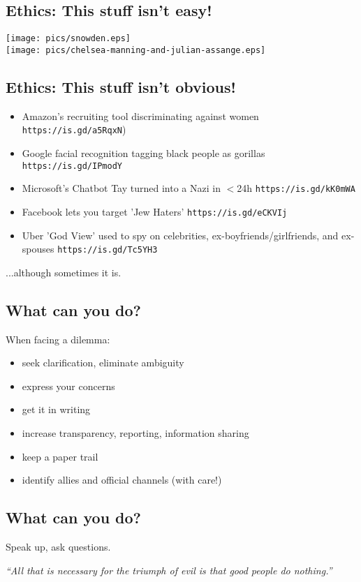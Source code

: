 \documentclass[xga]{xdvislides}
\begin{document}
\subsection{Ethics: This stuff isn't easy!}
\begin{center}
       \texttt{[image: pics/snowden.eps]} \\
       \texttt{[image: pics/chelsea-manning-and-julian-assange.eps]}
\end{center}

\subsection{Ethics: This stuff isn't obvious!}
\begin{itemize}
	\item Amazon's recruiting tool discriminating against women {\tt https://is.gd/a5RqxN})
	\item Google facial recognition tagging black people as gorillas {\tt https://is.gd/IPmodY}
	\item Microsoft's Chatbot Tay turned into a Nazi in $<$24h {\tt https://is.gd/kK0mWA}
	\item Facebook lets you target 'Jew Haters' {\tt https://is.gd/eCKVIj}
	\item Uber 'God View' used to spy on celebrities, ex-boyfriends/girlfriends, and ex-spouses {\tt https://is.gd/Tc5YH3}
\end{itemize}
\vspace{.5in}
...although sometimes it is.

\subsection{What can you do?}
When facing a dilemma:
\begin{itemize}
	\item seek clarification, eliminate ambiguity
	\item express your concerns
	\item get it in writing
	\item increase transparency, reporting, information sharing
	\item keep a paper trail
	\item identify allies and official channels (with care!)
\end{itemize}

\subsection{What can you do?}
\Huge
\vspace*{\fill}
\begin{center}

Speak up, ask questions. \\

\vspace{.5in}

{\em ``All that is necessary for the triumph of evil is
that good people do nothing.''} \\

\end{center}
\vspace*{\fill}
\Normalsize
\end{document}

